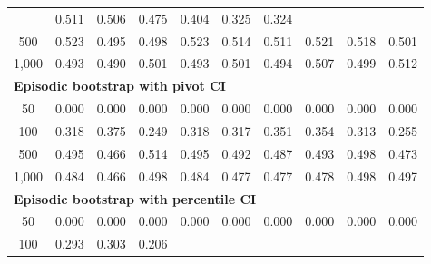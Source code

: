 \documentclass{article}
\numberwithin{equation}{section}
\begin{document}
\begin{table}[ht]
\begin{tabular}{c|ccc|cccccc}
& \cellcolor{covheat!100!white}0.511 & \cellcolor{covheat!100!white}0.506 & \cellcolor{covheat!87!white}0.475 & \cellcolor{covheat!52!white}0.404 & \cellcolor{covheat!13!white}0.325 & \cellcolor{covheat!12!white}0.324 \\
500
& \cellcolor{covheat!100!white}0.523 & \cellcolor{covheat!98!white}0.495 & \cellcolor{covheat!99!white}0.498
& \cellcolor{covheat!100!white}0.523 & \cellcolor{covheat!100!white}0.514 & \cellcolor{covheat!100!white}0.511 & \cellcolor{covheat!100!white}0.521 & \cellcolor{covheat!100!white}0.518 & \cellcolor{covheat!100!white}0.501 \\
1{,}000
& \cellcolor{covheat!96!white}0.493 & \cellcolor{covheat!95!white}0.490 & \cellcolor{covheat!100!white}0.501
& \cellcolor{covheat!96!white}0.493 & \cellcolor{covheat!100!white}0.501 & \cellcolor{covheat!97!white}0.494 & \cellcolor{covheat!100!white}0.507 & \cellcolor{covheat!100!white}0.499 & \cellcolor{covheat!100!white}0.512 \\
\hline
\multicolumn{10}{l}{\textbf{Episodic bootstrap with pivot CI}} \\ \hline
50
& 0.000 & 0.000 & 0.000
& 0.000 & 0.000 & 0.000 & 0.000 & 0.000 & 0.000 \\
100
& \cellcolor{covheat!9!white}0.318 & \cellcolor{covheat!38!white}0.375 & 0.249
& \cellcolor{covheat!9!white}0.318 & \cellcolor{covheat!9!white}0.317 & \cellcolor{covheat!25!white}0.351 & \cellcolor{covheat!27!white}0.354 & \cellcolor{covheat!7!white}0.313 & 0.255 \\
500
& \cellcolor{covheat!98!white}0.495 & \cellcolor{covheat!83!white}0.466 & \cellcolor{covheat!100!white}0.514
& \cellcolor{covheat!98!white}0.495 & \cellcolor{covheat!96!white}0.492 & \cellcolor{covheat!94!white}0.487 & \cellcolor{covheat!96!white}0.493 & \cellcolor{covheat!99!white}0.498 & \cellcolor{covheat!86!white}0.473 \\
1{,}000
& \cellcolor{covheat!92!white}0.484 & \cellcolor{covheat!83!white}0.466 & \cellcolor{covheat!99!white}0.498
& \cellcolor{covheat!92!white}0.484 & \cellcolor{covheat!88!white}0.477 & \cellcolor{covheat!88!white}0.477 & \cellcolor{covheat!89!white}0.478 & \cellcolor{covheat!99!white}0.498 & \cellcolor{covheat!98!white}0.497 \\
\hline
\multicolumn{10}{l}{\textbf{Episodic bootstrap with percentile CI}} \\ \hline
50
& 0.000 & 0.000 & 0.000
& 0.000 & 0.000 & 0.000 & 0.000 & 0.000 & 0.000 \\
100
& 0.293 & \cellcolor{covheat!2!white}0.303 & 0.206

\end{tabular}
\end{table}
\end{document}
